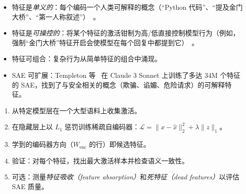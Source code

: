 \begin{itemize}
  \item 特征是\emph{单义的}：每个编码一个人类可解释的概念（``Python 代码''、``提及金门大桥''、``第一人称叙述''）~\cite{bricken2023monosemanticity}。
  \item 特征是\emph{可操控的}：将某个特征的激活钳制为高/低直接控制模型行为（例如，强制``金门大桥''特征开启会使模型在每个回复中都提到它）~\cite{templeton2024scaling}。
  \item 特征可组合：复杂行为从简单特征的组合中涌现。
  \item SAE 可扩展：Templeton 等~\cite{templeton2024scaling} 在 Claude 3 Sonnet 上训练了多达 34M 个特征的 SAE，找到了与安全相关的概念（欺骗、谄媚、危险请求）的可解释特征。
\end{itemize}

\begin{keybox}
\begin{enumerate}
  \item 从特定模型层在一个大型语料上收集激活。
  \item 在隐藏层上以 $L_1$ 惩罚训练稀疏自编码器：$\mathcal{L} = \|x - \hat{x}\|_2^2 + \lambda \|z\|_1$。
  \item 学到的编码器方向（$W_{\text{enc}}$ 的行）即候选特征。
  \item 验证：对每个特征，找出最大激活样本并检查语义一致性。
  \item 可选：测量\emph{特征吸收（feature absorption）}和\emph{死特征（dead features）}以评估 SAE 质量。
\end{enumerate}
\end{keybox}


